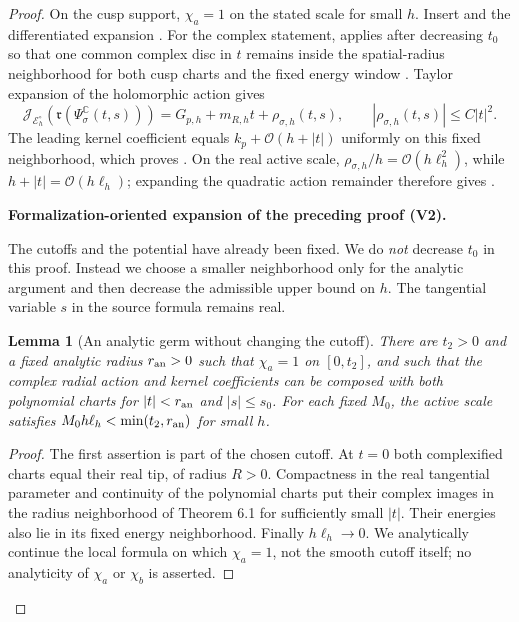 \documentclass[11pt]{article}
\newtheorem{lemma}[theorem]{Lemma}
\newcommand{\formalisationparentid}{X}
\newenvironment{formalisationaddition}[1]{\par\medskip\begingroup\color{blue}\def\formalisationparentid{#1}\setcounter{formalizationsublemma}{0}\let\lemma\formalizationsublemma\let\endlemma\endformalizationsublemma
  \def\Eo{\mathcal E_h^\circ}\def\EE{\mathcal E_h}\def\phio{\phi_h^\circ}\def\phih{\phi_h}\def\Ho{H_h^{\rm atom}(v^\circ)}\def\Ha{H_h^{\rm atom}}\def\HL{H_h^{L}}\def\Dh{D_h}\def\Log{\operatorname{Log}}\def\ellh{\ell_h}\def\Gp{G_{p,h}}\def\Ast{A_{*,h}}\def\ahat{\widehat{\mathfrak a}_h}\def\ah{\mathfrak a_h}\def\rh{\widehat\rho_h}\def\deltah{\widehat\delta_h}\def\oldref##1{\textup{(##1)}}\def\interface##1{\par\noindent\textit{Analytical interface used here.} ##1\par}\def\finish{\par\noindent\textit{Conclusion of the formalization-oriented expansion.} }\par\noindent\textbf{Formalization-oriented expansion of the preceding proof (V2).}\par\smallskip
}{\par\endgroup\medskip
}
\newcommand{\C}{\mathbb C}
\newcommand{\cE}{\mathcal E}
\newcommand{\cJ}{\mathcal J}
\newcommand{\cO}{\mathcal O}
\begin{document}
\begin{proof}
On the cusp support, $\chi_a=1$ on the stated scale for small $h$.  Insert
 and the differentiated expansion
.  For the complex statement, 
applies after decreasing $t_0$ so that one common complex disc in $t$ remains
inside the spatial-radius neighborhood for both cusp charts and the fixed
energy window .  Taylor expansion of the
holomorphic action gives
\[
 \cJ_{\cE_h^\circ}\!\left(\mathfrak r(\Psi_\sigma^\C(t,s))\right)
 =G_{p,h}+m_{R,h}t+\rho_{\sigma,h}(t,s),
 \qquad |\rho_{\sigma,h}(t,s)|\le C|t|^2.
\]
The leading kernel coefficient equals $k_p+\cO(h+|t|)$ uniformly on this
fixed neighborhood, which proves .
On the real active scale,
$\rho_{\sigma,h}/h=\cO(h\ell_h^2)$, while $h+|t|=\cO(h\ell_h)$; expanding
the quadratic action remainder therefore gives
.

\begin{formalisationaddition}{L6.3}
The cutoffs and the potential have already been fixed. We do \emph{not} decrease $t_0$ in this proof. Instead we choose a smaller neighborhood only for the analytic argument and then decrease the admissible upper bound on $h$. The tangential variable $s$ in the source formula remains real.

\begin{lemma}[An analytic germ without changing the cutoff]\label{sublemma:L6-3-germ}
There are $t_2>0$ and a fixed analytic radius $r_{\rm an}>0$ such that $\chi_a=1$ on $[0,t_2]$, and such that the complex radial action and kernel coefficients can be composed with both polynomial charts for $|t|<r_{\rm an}$ and $|s|\le s_0$. For each fixed $M_0$, the active scale satisfies $M_0h\ellh<\min(t_2,r_{\rm an})$ for small $h$.
\end{lemma}
\begin{proof}
The first assertion is part of the chosen cutoff. At $t=0$ both complexified charts equal their real tip, of radius $R>0$. Compactness in the real tangential parameter and continuity of the polynomial charts put their complex images in the radius neighborhood of Theorem 6.1 for sufficiently small $|t|$. Their energies also lie in its fixed energy neighborhood. Finally $h\ellh\to0$. We analytically continue the local formula on which $\chi_a=1$, not the smooth cutoff itself; no analyticity of $\chi_a$ or $\chi_b$ is asserted.
\end{proof}


\end{formalisationaddition}
\end{proof}
\end{document}
